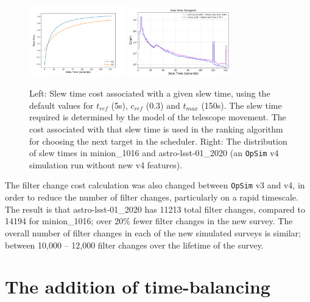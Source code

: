 \documentclass[DM,authoryear,toc]{lsstdoc}
\newcommand{\opsim}{\texttt{OpSim}\xspace}
\begin{document}
\begin{figure}[ht]
\centering
\includegraphics[width=0.37\textwidth]{figures/slewcost}
\includegraphics[width=0.4\textwidth]{figures/slewtimes}
\caption{Left: Slew time cost associated with a given slew time, using the default values for $t_{ref}$ (5s), $c_{ref}$ (0.3) and $t_{max}$ (150s). The slew time required is determined by the model of the telescope movement. The cost associated with that slew time is used in the ranking algorithm for choosing the next target in the scheduler. Right: The distribution of slew times in minion\_1016 and astro-lsst-01\_2020 (an \opsim v4 simulation run without new v4 features).
\label{fig:slewcost}}
\end{figure}

The filter change cost calculation was also changed between \opsim v3 and v4, in order to reduce the number of filter changes, particularly on a rapid timescale. The result is that astro-lsst-01\_2020 has 11213 total filter changes, compared to 14194 for minion\_1016; over 20\% fewer filter changes in the new survey. The overall number of filter changes in each of the new simulated surveys is similar; between 10,000 -- 12,000 filter changes over the lifetime of the survey.

\section{The addition of time-balancing}
\end{document}
